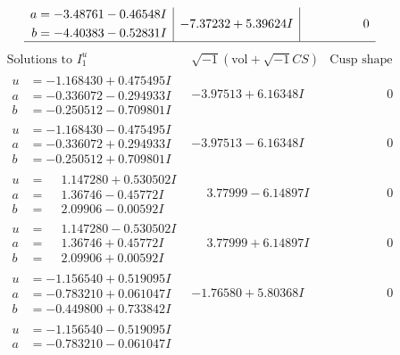 \documentclass[1p]{elsarticle_modified}
\theoremstyle{definition}
\newcommand{\I}{\sqrt{-1}}
\begin{document}
$$\begin{array}{c|c|c}
\begin{aligned}
a &= -3.48761 - 0.46548 I \\
b &= -4.40383 - 0.52831 I\end{aligned}
 & -7.37232 + 5.39624 I & \phantom{-0.000000 } 0\\
 \hline 
 \end{array}$$\newpage$$\begin{array}{c|c|c}  
\text{Solutions to }I^u_{1}& \I (\text{vol} + \sqrt{-1}CS) & \text{Cusp shape}\\
 \hline 
\begin{aligned}
u &= -1.168430 + 0.475495 I \\
a &= -0.336072 - 0.294933 I \\
b &= -0.250512 - 0.709801 I\end{aligned}
 & -3.97513 + 6.16348 I & \phantom{-0.000000 } 0 \\ \hline\begin{aligned}
u &= -1.168430 - 0.475495 I \\
a &= -0.336072 + 0.294933 I \\
b &= -0.250512 + 0.709801 I\end{aligned}
 & -3.97513 - 6.16348 I & \phantom{-0.000000 } 0 \\ \hline\begin{aligned}
u &= \phantom{-}1.147280 + 0.530502 I \\
a &= \phantom{-}1.36746 - 0.45772 I \\
b &= \phantom{-}2.09906 - 0.00592 I\end{aligned}
 & \phantom{-}3.77999 - 6.14897 I & \phantom{-0.000000 } 0 \\ \hline\begin{aligned}
u &= \phantom{-}1.147280 - 0.530502 I \\
a &= \phantom{-}1.36746 + 0.45772 I \\
b &= \phantom{-}2.09906 + 0.00592 I\end{aligned}
 & \phantom{-}3.77999 + 6.14897 I & \phantom{-0.000000 } 0 \\ \hline\begin{aligned}
u &= -1.156540 + 0.519095 I \\
a &= -0.783210 + 0.061047 I \\
b &= -0.449800 + 0.733842 I\end{aligned}
 & -1.76580 + 5.80368 I & \phantom{-0.000000 } 0 \\ \hline\begin{aligned}
u &= -1.156540 - 0.519095 I \\
a &= -0.783210 - 0.061047 I \\

\end{aligned}
\end{array}$$
\end{document}
